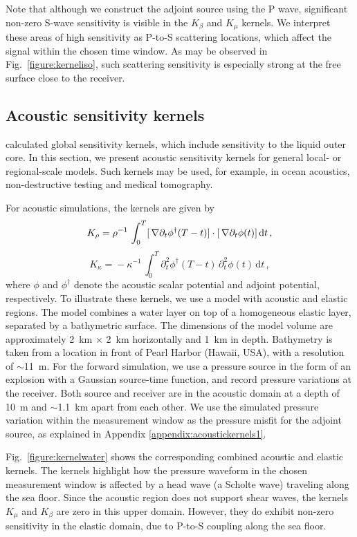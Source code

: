 \documentclass[referee,extra]{gji}
\newcommand{\bequ}{\begin{equation} }
\newcommand{\eequ}{\end{equation} }
\newcommand{\bnabla}{ \, {\bf \nabla } }
\renewcommand{\cite}[1]{\citet{#1}}
\begin{document}
Note that although we construct the adjoint source using the P wave,
significant non-zero S-wave sensitivity is visible in the $K_\beta$ and $K_\mu$ kernels.
We interpret these areas of high sensitivity as P-to-S scattering locations,
which affect the signal within the chosen time window.
As may be observed in Fig.~\ref{figure:kerneliso},
such scattering sensitivity is especially strong at the free surface close to the receiver.

\subsection{Acoustic sensitivity kernels}\label{subsec:acoustickernels}

\cite{LiTr08} calculated global sensitivity kernels, which include sensitivity to the liquid outer core.
In this section, we present acoustic sensitivity kernels for general local- or regional-scale models.
Such kernels may be used, for example, in ocean acoustics, non-destructive testing and medical tomography.

For acoustic simulations, the kernels are given by
\bequ
K_\rho    =  \rho^{-1} \,\int_0^T [\bnabla\partial_t\phi^{\dag} (  T-t )] \cdot [\bnabla\partial_t\phi(t)] \,\mathrm{d}t \,,
\eequ
\bequ
K_\kappa   = \mbox{}-\kappa^{-1}  \, \int_0^T     \partial_t^2 \phi^\dag (  T-t ) \, \partial_t^2 \phi (  t ) \, \mathrm{d}t \,,
\eequ
where $\phi$ and $\phi^\dag$ denote the acoustic scalar potential and adjoint potential, respectively.
To illustrate these kernels,
we use a model with acoustic and elastic regions.
The model combines a water layer on top of a homogeneous elastic layer,
separated by a bathymetric surface.
The dimensions of the model volume are approximately 2~km $\times$ 2~km horizontally and 1~km in depth.
Bathymetry is taken from a location in front of Pearl Harbor (Hawaii, USA),
with a resolution of $\sim$11~m.
For the forward simulation,
we use a pressure source in the form of an explosion with a Gaussian source-time function,
and record pressure variations at the receiver.
Both source and receiver are in the acoustic domain at a depth of 10~m and $\sim$1.1~km apart from each other.
We use the simulated pressure variation within the measurement window as the pressure misfit for the adjoint source,
as explained in Appendix \ref{appendix:acoustickernels1}.

Fig.~\ref{figure:kernelwater} shows the corresponding combined acoustic and elastic kernels.
The kernels highlight how the pressure waveform in the chosen measurement window is affected by a head
wave (a Scholte wave) traveling along the sea floor.
Since the acoustic region does not support shear waves,
the kernels $K_\mu$ and $K_\beta$ are zero in this upper domain.
However, they do exhibit non-zero sensitivity in the elastic domain, due to P-to-S coupling along the sea floor.
\end{document}
